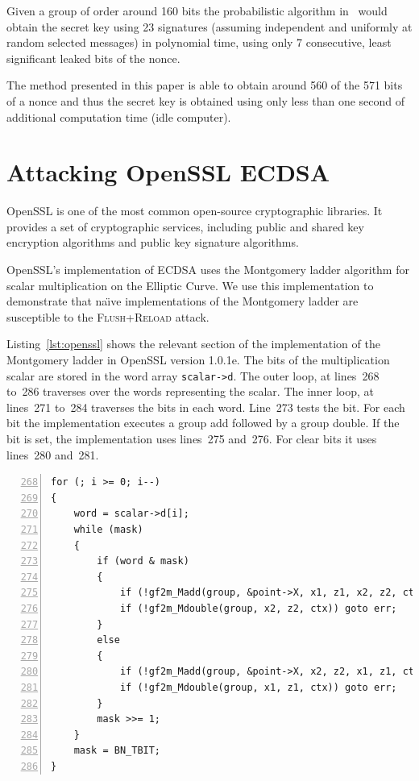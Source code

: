 \documentclass{llncs}
\begin{document}
Given a group of order around 160 bits the probabilistic algorithm in~\cite{nguyen03insecurity} would obtain the secret key using 23 signatures (assuming independent and uniformly at random selected messages) in polynomial time, using only 7 consecutive, least significant leaked bits of the nonce.

The method presented in this paper is able to obtain around 560 of the 571 bits of a nonce and thus the secret key is obtained using only less than one second of additional computation time (idle computer).

\section{Attacking OpenSSL ECDSA}\label{sec:attack}
OpenSSL is one of the most common open-source cryptographic libraries.
It provides a set of cryptographic services, including public and shared key encryption 
algorithms and public key signature algorithms.

OpenSSL's implementation of ECDSA uses the Montgomery ladder algorithm for scalar multiplication
on the Elliptic Curve.
We use this implementation to demonstrate that na{\"\i}ve implementations of the Montgomery ladder are
susceptible to the \textsc{Flush+Reload} attack.

Listing~\ref{lst:openssl} shows the relevant section of the implementation of the Montgomery ladder in OpenSSL version 1.0.1e.
The bits of the multiplication scalar are stored in the word array \texttt{scalar->d}.
The outer loop, at lines~268 to~286 traverses over the words representing the scalar.
The inner loop, at lines~271 to~284 traverses the bits in each word.
Line~273 tests the bit. 
For each bit the implementation executes a group add followed by a group double.
If the bit is set, the implementation uses lines~275 and~276.
For clear bits it uses lines~280 and~281.

\begin{lstlisting}[numbers=left,firstnumber=268,float=htb,caption=OpenSSL Implementation of the Montgomery Ladder,label=lst:openssl]
for (; i >= 0; i--)
{
    word = scalar->d[i];
    while (mask)
    {
        if (word & mask)
        {
            if (!gf2m_Madd(group, &point->X, x1, z1, x2, z2, ctx)) goto err;
            if (!gf2m_Mdouble(group, x2, z2, ctx)) goto err;
        }
        else
        {
            if (!gf2m_Madd(group, &point->X, x2, z2, x1, z1, ctx)) goto err;
            if (!gf2m_Mdouble(group, x1, z1, ctx)) goto err;
        }
        mask >>= 1;
    }
    mask = BN_TBIT;
}
\end{lstlisting}
\end{document}
